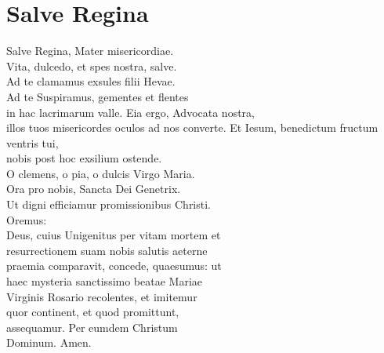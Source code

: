 \documentclass[paper=a5,pagesize=pdftex,fontsize=10pt,headinclude=on,twoside=off]{scrbook}
\begin{document}
\section{Salve Regina}
\begin{scripture}
  \begin{poetry}
    Salve Regina, Mater misericordiae.\\
    Vita, dulcedo, et spes nostra, salve.\\
    Ad te clamamus exsules filii Hevae.\\
    Ad te Suspiramus, gementes et flentes\\
    in hac lacrimarum valle.
    Eia ergo, Advocata nostra, \\
    illos tuos misericordes oculos ad nos converte.
    Et Iesum, benedictum fructum ventris tui, \\
    nobis post hoc exsilium ostende.\\
    O clemens, o pia, o dulcis Virgo Maria.\\
    Ora pro nobis, Sancta Dei Genetrix.\\
    Ut digni efficiamur promissionibus Christi.\\
    Oremus:\\
    Deus, cuius Unigenitus per vitam mortem et\\
    resurrectionem suam nobis salutis aeterne\\
    praemia comparavit, concede, quaesumus: ut\\
    haec mysteria sanctissimo beatae Mariae\\
    Virginis Rosario recolentes, et imitemur\\
    quor continent, et quod promittunt,\\
    assequamur. Per eumdem Christum\\
    Dominum. Amen.\\
  \end{poetry}
\end{scripture}

\end{document}
